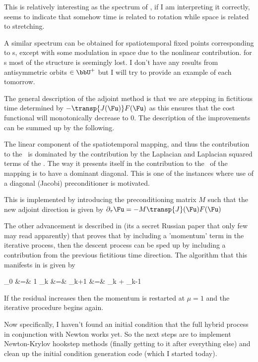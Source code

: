 This is relatively interesting as the spectrum of , if I am interpreting it correctly, seems to indicate
that somehow time is related to rotation while space is related to stretching.

A similar spectrum can be obtained for spatiotemporal fixed points
corresponding to {\ppo}s, except with some modulation in space due to the
nonlinear contribution. for {\rpo}s most of the structure is seemingly
lost. I don't have any results from antisymmetric orbits $\in \bbU^+$ but
I will try to provide an example of each tomorrow.

The general description of the adjoint method is that we are stepping
in fictitious time determined by $-\transp{J(\Fu)} F(\Fu)$ as this ensures that
the cost functional will monotonically decrease to $0$. The description of the improvements
can be summed up by the following.

The linear component of the spatiotemporal mapping, and thus the contribution
to the \jacobianM\ is dominated by the contribution by the Laplacian and
Laplacian squared terms of the \KSe. The way it presents itself in the
contribution to the \jacobianM\ of the mapping is to have a dominant
diagonal. This is one of the instances where use of a diagonal (Jacobi)
preconditioner is motivated.

This is implemented by introducing the preconditioning matrix $M$ such that the new adjoint direction
is given by  $\partial_\tau \Fu = -M\transp{J}(\Fu) F(\Fu)$

The other advancement is described in (its a secret Russian paper that only few may read apparently)
 that proves that by including a 'momentum' term in the iterative process, then
the descent process can be sped up by including a contribution from the previous fictitious time
direction. The algorithm that this manifests in is given by

\bea \label{eqn:Nesterov_factor}
\mu_0 &=& 1 \continue
\mu_k &=&  \continue
\delta \Fu_{k+1} &=& \delta \Fu_k +  \delta \Fu_{k-1}
\eea

If the residual increases then the momentum is restarted at $\mu = 1$ and the iterative
procedure begins again.

Now specifically, I haven't found an initial condition that the full hybrid process
in conjunction with Newton works yet. So the next steps are to implement Newton-Krylov
hookstep methods (finally getting to it after everything else) and clean up the initial
condition generation code (which I started today).

